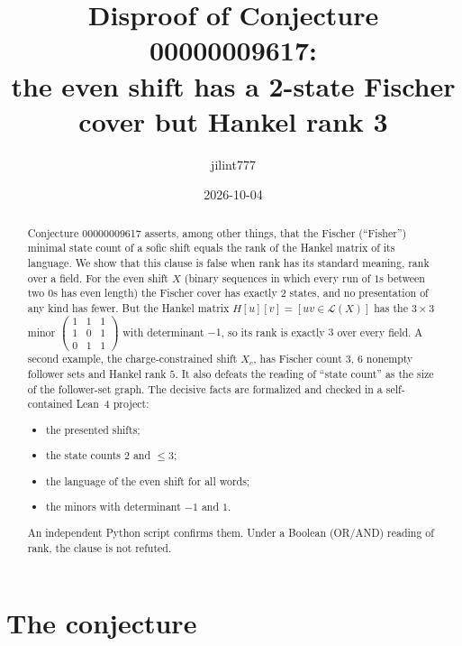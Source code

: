 \documentclass[11pt]{article}
\title{Disproof of Conjecture 00000009617:\\
the even shift has a 2-state Fischer cover but Hankel rank 3}
\author{jilint777}
\date{2026-10-04}
\theoremstyle{definition}
\theoremstyle{remark}
\newcommand{\Lang}{\mathcal{L}}
\begin{document}
\maketitle

\begin{abstract}
Conjecture 00000009617 asserts, among other things, that the Fischer
(``Fisher'') minimal state count of a sofic shift equals the rank of the
Hankel matrix of its language. We show that this clause is false when rank
has its standard meaning, rank over a field. For the even shift $X$ (binary
sequences in which every run of $1$s between two $0$s has even length) the
Fischer cover has exactly $2$ states, and no presentation of any kind has
fewer. But the Hankel matrix $H[u][v]=[uv\in\Lang(X)]$ has the $3\times 3$ minor
$\left(\begin{smallmatrix}1&1&1\\1&0&1\\0&1&1\end{smallmatrix}\right)$
with determinant $-1$, so its rank is exactly $3$ over every field. A second
example, the charge-constrained shift $X_c$, has Fischer count $3$, $6$ nonempty
follower sets and Hankel rank $5$. It also defeats the reading of ``state
count'' as the size of the follower-set graph. The decisive facts are formalized
and checked in a self-contained Lean~4 project:
\begin{itemize}
\item the presented shifts;
\item the state counts $2$ and $\le 3$;
\item the language of the even shift for all words;
\item the minors with determinant $-1$ and $1$.
\end{itemize}
An independent Python script confirms them. Under a Boolean (OR/AND) reading of
rank, the clause is not refuted.
\end{abstract}

\section{The conjecture}
\end{document}
